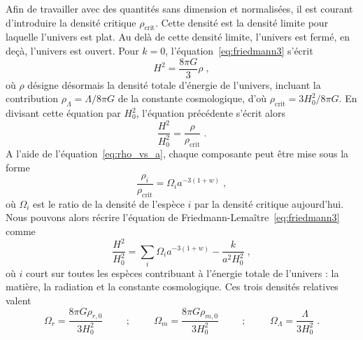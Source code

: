 Afin de travailler avec des quantités sans dimension et normalisées, il est courant d'introduire la densité critique $\rho_{\mathrm{crit}}$. Cette densité est la densité limite pour laquelle l'univers est plat. Au delà de cette densité limite, l'univers est fermé, en deçà, l'univers est ouvert. Pour $k = 0$, l'équation~\ref{eq:friedmann3} s'écrit
\begin{equation}
  H^{2} = \frac{8 \pi G }{3} \rho  \; ,
\end{equation}
où $\rho$ désigne désormais la densité totale d'énergie de l'univers, incluant la contribution $\rho_{\Lambda} = \Lambda / 8 \pi G$ de la constante cosmologique, d'où $\rho_{\mathrm{crit}} = 3 H_0^2 / 8 \pi G$. En divisant cette équation par $H_{0}^{2}$, l'équation précédente s'écrit alors
\begin{equation}
  \label{eq:friedmann5}
  \frac{H^2}{H_0^2} = \frac{\rho}{\rho_{\mathrm{crit}}}  \; .
\end{equation}
A l'aide de l'équation~\ref{eq:rho_vs_a}, chaque composante peut être mise sous la forme
\begin{equation}
  \label{eq:def_omgega}
  \frac{\rho_i}{\rho_{\mathrm{crit}}} = \Omega_i a^{-3 (1+w)}  \; , 
\end{equation}
où $\Omega_i$ est le ratio de la densité de l'espèce $i$ par la densité critique aujourd'hui. Nous pouvons alors récrire l'équation de Friedmann-Lemaître~\ref{eq:friedmann3} comme
\begin{equation}
  \label{eq:friedmann6}
  \frac{H^2}{H_0^2} = \sum\limits_i \Omega_i a^{-3 (1+w)} - \frac{k}{a^{2} H_{0}^{2}} \; ,
\end{equation}
où $i$ court sur toutes les espèces contribuant à l'énergie totale de l'univers : la matière, la radiation et la constante cosmologique. Ces trois densités relatives valent
\begin{equation}
  \label{eq:def_omega2}
\Omega_{r} = \frac{8 \pi G \rho_{r, 0}}{3 H_{0}^{2}} \hspace{1cm} ; \hspace{1cm} \Omega_{m} = \frac{8 \pi G \rho_{m, 0}}{3 H_{0}^{2}} \hspace{1cm} ;\hspace{1cm} \Omega_{\Lambda} = \frac{\Lambda}{3 H_{0}^{2}}  \; .
\end{equation}
